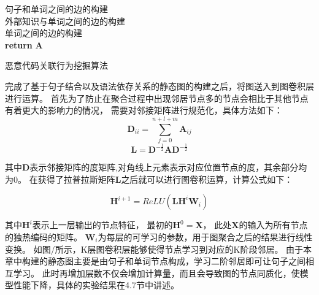 \vspace{0.5cm}
\IncMargin{1em}
\begin{algorithm}[H]
\wuhao
{}
\BlankLine 
{}
\BlankLine
句子和单词之间的边的构建\\
外部知识与单词之间的边的构建\\
单词之间的边的构建\\
\textbf{return} \emph{$\mathbf{A}$}
\caption{恶意代码关联行为挖掘算法}
\label{a1} 
\end{algorithm}
\DecMargin{1em}
\vspace{0.5cm}


完成了基于句子结合以及语法依存关系的静态图的构建之后，将图送入到图卷积层进行运算。
首先为了防止在聚合过程中出现邻居节点多的节点会相比于其他节点有着更大的影响力的情况，
需要对邻接矩阵进行规范化，具体方法如下：
\begin{equation}
	\label{Dii}
	\mathbf{D}_{ii} = \sum_{j=0}^{n+l+m}\mathbf{A}_{ij}
\end{equation}
\begin{equation}
	\label{L}
	\mathbf{L} = \mathbf{D}^{-\frac{1}{2}} \mathbf{A} \mathbf{D}^{-\frac{1}{2}}
\end{equation}

其中$\mathbf{D}$表示邻接矩阵的度矩阵,对角线上元素表示对应位置节点的度，其余部分均为0。
在获得了拉普拉斯矩阵$\mathbf{L}$之后就可以进行图卷积运算，计算公式如下：

\begin{equation}
	\label{graphconver}
	\mathbf{H}^{i+1} = ReLU(\mathbf{LH}^i\mathbf{W}_i)
\end{equation}

其中$\mathbf{H}^i$表示上一层输出的节点特征，
最初的$\mathbf{H}^0=\mathbf{X}$，
此处$\mathbf{X}$的输入为所有节点的独热编码的矩阵。
$\mathbf{W}_i$为每层的可学习的参数，用于图聚合之后的结果进行线性变换。
如图/所示，K层图卷积层能够使得节点学习到对应的K阶段邻居。
由于本章中构建的静态图主要是由句子和单词节点构成，学习二阶邻居即可让句子之间相互学习。
此时再增加层数不仅会增加计算量，而且会导致图的节点同质化，使模型性能下降，具体的实验结果在4.7节中讲述。

